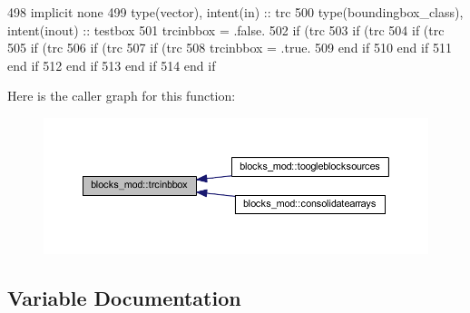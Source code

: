 \begin{DoxyCode}
498     \textcolor{keywordtype}{implicit none}
499     \textcolor{keywordtype}{type}(vector), \textcolor{keywordtype}{intent(in)} :: trc
500     \textcolor{keywordtype}{type}(boundingbox\_class), \textcolor{keywordtype}{intent(inout)} :: testbox
501     trcinbbox = .false.
502     \textcolor{keywordflow}{if} (trc%
503         \textcolor{keywordflow}{if} (trc%
504             \textcolor{keywordflow}{if} (trc%
505                 \textcolor{keywordflow}{if} (trc%
506                     \textcolor{keywordflow}{if} (trc%
507                         \textcolor{keywordflow}{if} (trc%
508                             trcinbbox = .true.
509 \textcolor{keywordflow}{                        end if}
510 \textcolor{keywordflow}{                    end if}
511 \textcolor{keywordflow}{                end if}
512 \textcolor{keywordflow}{            end if}
513 \textcolor{keywordflow}{        end if}
514 \textcolor{keywordflow}{    end if}
\end{DoxyCode}
Here is the caller graph for this function\+:\nopagebreak
\begin{figure}[H]
\begin{center}
\leavevmode
\includegraphics[width=350pt]{namespaceblocks__mod_a101d0a23b5b56baf6e5bd35bc7b677b0_icgraph}
\end{center}
\end{figure}


\subsection{Variable Documentation}
\mbox{\label{namespaceblocks__mod_a13b3fc755dfbf3e333490a3f931b28aa}} 
